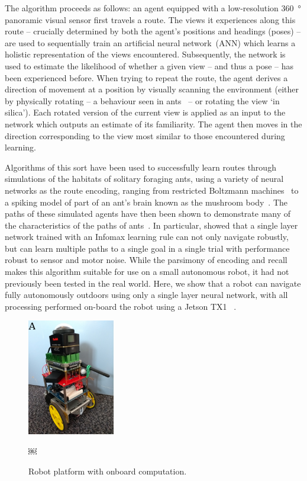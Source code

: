 \documentclass[letterpaper]{article}
\begin{document}
The algorithm proceeds as follows: an agent equipped with a low-resolution \SI{360}{\degree} panoramic visual sensor first travels a route. 
The views it experiences along this route -- crucially determined by both the agent’s positions and headings (poses) -- are used to sequentially train an artificial neural network~(ANN) which learns a holistic representation of the views encountered. Subsequently, the network is used to estimate the likelihood of whether a given view -- and thus a pose -- has been experienced before. 
When trying to repeat the route, the agent derives a direction of movement at a position by visually scanning the environment (either by physically rotating -- a behaviour seen in ants~\citep{Wystrach2014} -- or rotating the view `in silica').
Each rotated version of the current view is applied as an input to the network which outputs an estimate of its familiarity.
The agent then moves in the direction corresponding to the view most similar to those encountered during learning. 

Algorithms of this sort have been used to successfully learn routes through simulations of the habitats of solitary foraging ants, using a variety of neural networks as the route encoding, ranging from restricted Boltzmann machines~\citep{Baddeley2011models} to a spiking model of part of an ant’s brain known as the mushroom body~\citep{Ardin2016}.
The paths of these simulated agents have then been shown to demonstrate many of the characteristics of the paths of ants~\citep{Wystrach2013}. 
In particular, \citet{Baddeley2012} showed that a single layer network trained with an Infomax learning rule can not only navigate robustly, but can learn multiple paths to a single goal in a single trial with performance robust to sensor and motor noise. 
While the parsimony of encoding and recall makes this algorithm suitable for use on a small autonomous robot, it had not previously been tested in the real world. 
Here, we show that a robot can navigate fully autonomously outdoors using only a single layer neural network, with all processing performed on-board the robot using a Jetson TX1~\citep{NVIDIACorporation2016} .

\begin{figure}[t]
    \centering
    \includegraphics[height=2in]{figures/robot.jpg}
    \caption{Robot platform with onboard computation.}￼
    \label{fig:robot}
\end{figure}
\end{document}
